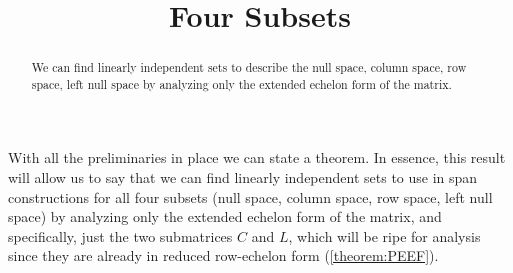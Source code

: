 \documentclass{ximera}
\title{Four Subsets}
\begin{document}
\begin{abstract}
  We can find linearly independent sets to describe the null space,
  column space, row space, left null space by analyzing only the
  extended echelon form of the matrix.
\end{abstract}
\maketitle

With all the preliminaries in place we can state a theorem. In
essence, this result will allow us to say that we can find linearly
independent sets to use in span constructions for all four subsets
(null space, column space, row space, left null space) by analyzing
only the extended echelon form of the matrix, and specifically, just
the two submatrices $C$ and $L$, which will be ripe for analysis since
they are already in reduced row-echelon form (\ref{theorem:PEEF}).
\end{document}
